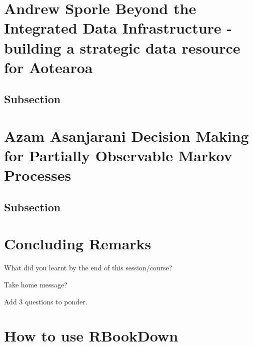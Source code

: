 \documentclass[
]{book}
\begin{document}
\hypertarget{andrew-sporle-beyond-the-integrated-data-infrastructure---building-a-strategic-data-resource-for-aotearoa}{%
\chapter*{Andrew Sporle \textbar{} Beyond the Integrated Data Infrastructure - building a strategic data resource for Aotearoa}\label{andrew-sporle-beyond-the-integrated-data-infrastructure---building-a-strategic-data-resource-for-aotearoa}}

\hypertarget{subsection}{%
\section{Subsection}\label{subsection}}

\hypertarget{azam-asanjarani-decision-making-for-partially-observable-markov-processes}{%
\chapter*{Azam Asanjarani \textbar{} Decision Making for Partially Observable Markov Processes}\label{azam-asanjarani-decision-making-for-partially-observable-markov-processes}}

\hypertarget{subsection}{%
\section{Subsection}\label{subsection}}

\hypertarget{concluding-remarks}{%
\chapter*{Concluding Remarks}\label{concluding-remarks}}

What did you learnt by the end of this session/course?

Take home message?

Add 3 questions to ponder.

\hypertarget{how-to-use-rbookdown}{%
\chapter*{How to use RBookDown}\label{how-to-use-rbookdown}}
\end{document}
